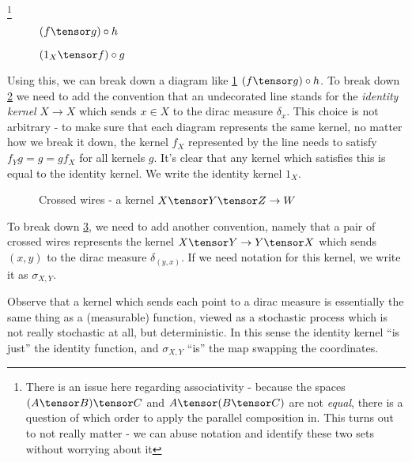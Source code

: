 \documentclass{article}
\begin{document}
\footnote{There is an issue here regarding associativity - because the spaces $(A \tensor B) \tensor C$ and $A \tensor (B \tensor C)$ are not \emph{equal}, there is a question of which order to apply the parallel composition in. This turns out to not really matter - we can abuse notation and identify these two sets without worrying about it}

\begin{figure}
    \begin{center}
    
    \end{center}
\caption{$(f \tensor g) \circ h$}
    \label{fig:ex1}
\end{figure}
    
\begin{figure}
\begin{center}

\end{center}
\caption{$(1_X \tensor f) \circ g$}
\label{fig:ex2}
\end{figure}

Using this, we can break down a diagram like \cref{fig:ex1} $(f \tensor g) \circ h$.
To break down \cref{fig:ex2} we need to add the convention that an undecorated line stands for the \emph{identity kernel} $X \to X$ which sends $x\in X$ to the dirac measure $\delta_x$.
This choice is not arbitrary - to make sure that each diagram represents the same kernel, no matter how we break it down, the kernel $f_X$ represented by the line needs to satisfy $f_Yg = g = gf_X$ for all kernels $g$.
It's clear that any kernel which satisfies this is equal to the identity kernel.
We write the identity kernel $1_X$.

\begin{figure}
\begin{center}

\end{center}
\caption{Crossed wires - a kernel $X \tensor Y \tensor Z \to W$}

\label{fig:cross}
\end{figure}


To break down \cref{fig:cross}, we need to add another convention, namely that a pair of crossed wires represents the kernel $X \tensor Y \to Y \tensor X$
which sends $(x,y)$ to the dirac measure $\delta_{(y,x)}$.
If we need notation for this kernel, we write it as $\sigma_{X,Y}$.

Observe that a kernel which sends each point to a dirac measure is essentially the same thing as a (measurable) function, viewed as a stochastic process which is not really stochastic at all, but deterministic. In this sense the identity kernel ``is just'' the identity function, and $\sigma_{X,Y}$ ``is'' the map swapping the coordinates.
\end{document}
